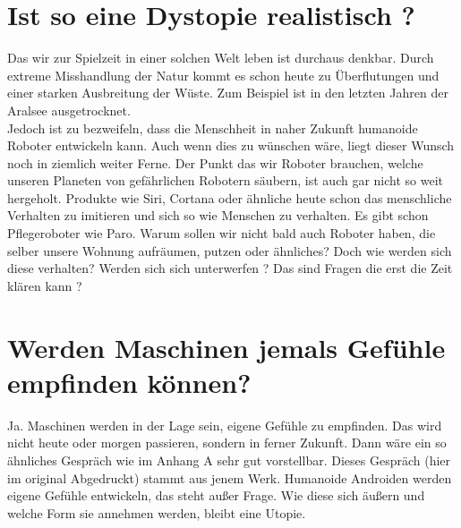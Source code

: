 \section{Ist so eine Dystopie realistisch ?}
Das wir zur Spielzeit in einer solchen Welt leben ist durchaus denkbar. Durch extreme Misshandlung der Natur kommt es schon heute zu Überflutungen und einer starken Ausbreitung der Wüste. Zum Beispiel ist in den letzten Jahren der Aralsee ausgetrocknet. \\
Jedoch ist zu bezweifeln, dass die Menschheit in naher Zukunft humanoide Roboter entwickeln kann. Auch wenn dies zu wünschen wäre, liegt dieser Wunsch noch in ziemlich weiter Ferne. Der Punkt das wir Roboter brauchen, welche unseren Planeten von gefährlichen Robotern säubern, ist auch gar nicht so weit hergeholt. Produkte wie Siri, Cortana oder ähnliche heute schon das menschliche Verhalten zu imitieren und sich so wie Menschen zu verhalten. Es gibt schon Pflegeroboter wie Paro. Warum sollen wir nicht bald auch Roboter haben, die selber unsere Wohnung aufräumen, putzen oder ähnliches? Doch wie werden sich diese verhalten? Werden sich sich unterwerfen ? Das sind Fragen die erst die Zeit klären kann ? 


\section{Werden Maschinen jemals Gefühle empfinden können?}
Ja. Maschinen werden in der Lage sein, eigene Gefühle zu empfinden. Das wird nicht heute oder morgen passieren, sondern in ferner Zukunft. Dann wäre ein so ähnliches Gespräch wie im Anhang A sehr gut vorstellbar. Dieses Gespräch (hier im original Abgedruckt) stammt aus jenem Werk. Humanoide Androiden werden eigene Gefühle entwickeln, das steht außer Frage. Wie diese sich äußern und welche Form sie annehmen werden, bleibt eine Utopie.

